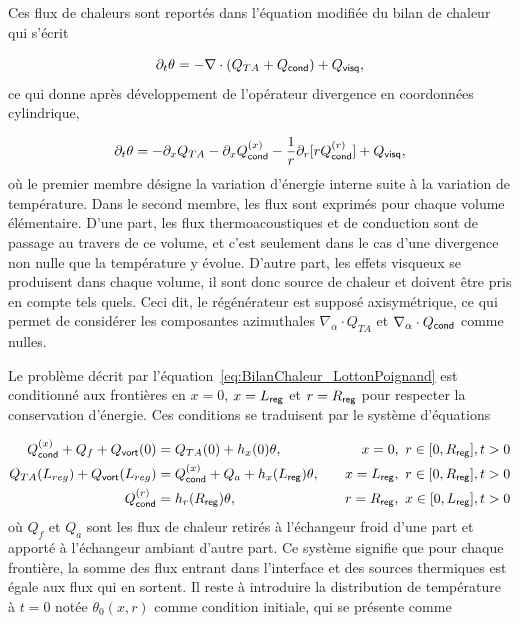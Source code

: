 \begin{enumerate}[label=\textbf{(\roman*)}]
\end{enumerate} 

Ces flux de chaleurs sont reportés dans l'équation modifiée du bilan de chaleur qui s'écrit

\begin{equation}
[\Phi\rho_0 C_p + (1-\Phi)\rho_s C_s]\partial_t \theta = - \nabla \cdot (Q_{TA} + Q_{\sf cond}) + Q_{\sf visq},
\label{eq:BilanChaleur_LottonPoignand}
\end{equation}
ce qui donne après développement de l'opérateur divergence en coordonnées cylindrique,

\begin{equation}
[\Phi\rho_0 C_p + (1-\Phi)\rho_s C_s]\partial_t \theta = - \partial_x Q_{TA} - \partial_x Q_{\sf cond}^{(x)} - \frac{1}{r}\partial_r[r Q_{\sf cond}^{(r)}] + Q_{\sf visq},
\label{eq:BilanChaleur_LottonPoignand_ApDvptCylin}
\end{equation}
où le premier membre désigne la variation d'énergie interne suite à la variation de température. Dans le second membre, les flux sont exprimés pour chaque volume élémentaire. D'une part, les flux thermoacoustiques et de conduction sont \og de passage \fg{} au travers de ce volume, et c'est seulement dans le cas d'une divergence non nulle que la température y évolue. D'autre part, les effets visqueux se produisent dans chaque volume, il sont donc source de chaleur et doivent être pris en compte tels quels. Ceci dit, le régénérateur est supposé axisymétrique, ce qui permet de considérer les composantes azimuthales $\nabla_\alpha \cdot Q_{TA}$ et $\nabla_\alpha \cdot Q_{\sf cond}$ comme nulles.

Le problème décrit par l'équation~\ref{eq:BilanChaleur_LottonPoignand} est conditionné aux frontières en $x=0$, $x=L_{\sf reg}$ et $r=R_{\sf reg}$ pour respecter la conservation d'énergie. Ces conditions se traduisent par le système d'équations

\begin{subequations}
	\begin{align}
		Q_{\sf cond}^{(x)} + Q_f + Q_{\sf vort}(0) &= Q_{TA}(0) + h_x(0)\theta,\quad &x=0,\ r \in [0,R_{\sf reg}], t>0 \label{eq:CondFront_x_0Froid}\\%
		Q_{TA}(L_{reg}) + Q_{\sf vort}(L_{reg})  &= Q_{\sf cond}^{(x)} + Q_a + h_x(L_{\sf reg})\theta, \quad &x=L_{\sf reg},\ r \in [0,R_{\sf reg}], t>0 \label{eq:CondFront_x_LregAmb}\\%
		Q_{\sf cond}^{(r)} &= h_r(R_{\sf reg})\theta, \quad &r=R_{\sf reg},\ x \in [0,L_{\sf reg}], t>0 \label{eq:CondFront_r_ra}
	\end{align}%
	\label{eq:CondFront}%
\end{subequations}
où $Q_f$ et $Q_a$ sont les flux de chaleur retirés à l'échangeur froid d'une part et apporté à l'échangeur ambiant d'autre part. Ce système signifie que pour chaque frontière, la somme des flux entrant dans l'interface et des sources thermiques est égale aux flux qui en sortent. Il reste à introduire la distribution de température à $t=0$ notée $\theta_0(x,r)$ comme condition initiale, qui se présente comme

